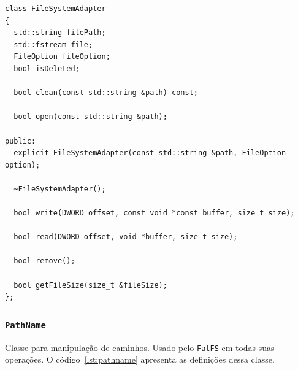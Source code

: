 \documentclass[
    12pt,				%
    oneside,   	        %
    a4paper,			%
    english,			%
    french,				%
    spanish,			%
    brazil,				%
    ]{pacotes/abntex2}
\begin{document}
\begin{lstlisting}[caption={Classe para manipulação de arquivos no sistema}, label={lst:filesystemadapter}]
class FileSystemAdapter
{
  std::string filePath;
  std::fstream file;
  FileOption fileOption;
  bool isDeleted;

  bool clean(const std::string &path) const;
  
  bool open(const std::string &path);

public:
  explicit FileSystemAdapter(const std::string &path, FileOption option);
  
  ~FileSystemAdapter();
  
  bool write(DWORD offset, const void *const buffer, size_t size);
  
  bool read(DWORD offset, void *buffer, size_t size);
  
  bool remove();
  
  bool getFileSize(size_t &fileSize);
};
\end{lstlisting}

\subsubsection{\texttt{PathName}}
\label{subsubsec:path_name}

Classe para manipulação de caminhos. Usado pelo \texttt{FatFS} em todas suas operações. O código~\ref{lst:pathname} apresenta as definições dessa classe.
\end{document}
